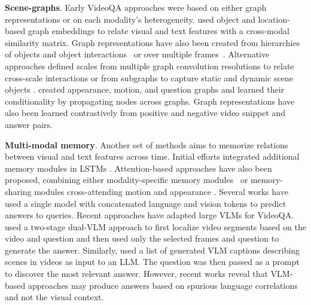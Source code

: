 

\noindent
\textbf{Scene-graphs}. Early VideoQA approaches were based on either graph representations \citep{jiang2020reasoning,tu2014joint} or on each modality's heterogeneity. \citet{huang2020location} used object and location-based graph embeddings to relate visual and text features with a cross-modal similarity matrix. Graph representations have also been created from hierarchies of objects and object interactions~\citep{dang2021hierarchical} or over multiple frames~\citep{liu2021hair}. Alternative approaches defined scales from multiple graph convolution resolutions to relate cross-scale interactions \citep{guo2021multi} or from subgraphs to capture static and dynamic scene objects  \citep{cherian20222}. \citet{park2021bridge} created appearance, motion, and question graphs and learned their conditionality by propagating nodes across graphs. Graph representations have also been learned contrastively \citep{xiao2023contrastive} from positive and negative video snippet and answer pairs.


\noindent
\textbf{Multi-modal memory}. Another set of methods aims to memorize relations between visual and text features across time. Initial efforts integrated additional memory modules in LSTMs \citep{jang2017tgif,xu2017video,zeng2017leveraging}. Attention-based approaches \citep{ye2017video} have also been proposed, combining either modality-specific memory modules~\citep{fan2019heterogeneous} or memory-sharing modules cross-attending motion and appearance \citep{gao2018motion,li2019beyond}. Several works \citep{gao2023mist,li2023discovering,yang2022zero,xue2023egocentric} have used a single model with concatenated language and vision tokens to predict answers to queries. Recent approaches have adapted large VLMs for VideoQA. \citet{yu2023self} used a two-stage dual-VLM approach to first localize video segments based on the video and question and then used only the selected frames and question to generate the answer. Similarly, \citet{min2024morevqa} used a list of generated VLM captions describing scenes in videos as input to an LLM. The question was then passed as a prompt to discover the most relevant answer. However, recent works \citep{xiao2024can} reveal that VLM-based approaches may produce answers based on spurious language correlations and not the visual context.



